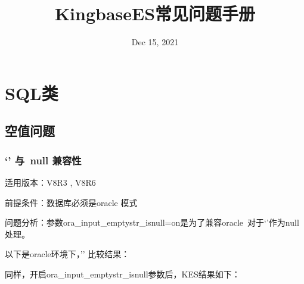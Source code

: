 \documentclass[letterpaper,10pt,english]{sphinxmanual}
\title{KingbaseES常见问题手册}
\date{Dec 15, 2021}
\author{ }
\begin{document}
\pagestyle{empty}
\sphinxmaketitle
\pagestyle{plain}
\sphinxtableofcontents
\pagestyle{normal}
\label{\detokenize{index-manual::doc}}



\chapter{SQL类}
\label{\detokenize{sql:sql}}\label{\detokenize{sql::doc}}

\section{空值问题}
\label{\detokenize{sql:id1}}

\subsection{‘’ 与 null 兼容性}
\label{\detokenize{sql:null}}
适用版本：V8R3 , V8R6

前提条件：数据库必须是oracle 模式

问题分析：参数ora\_input\_emptystr\_isnull=on是为了兼容oracle 对于‘’作为null处理。

以下是oracle环境下，’’ 比较结果：

\begin{sphinxVerbatim}[commandchars=\\\{\}]
          
 
     
  
       
  
        
 
\end{sphinxVerbatim}

同样，开启ora\_input\_emptystr\_isnull参数后，KES结果如下：
\end{document}
